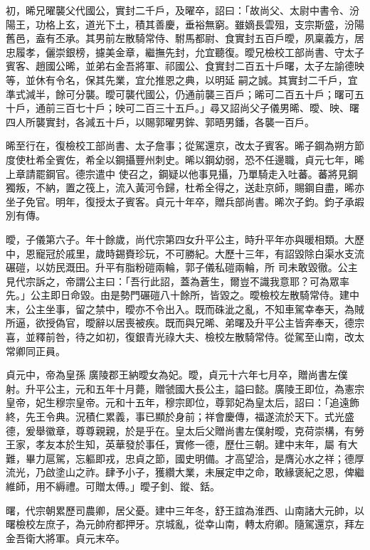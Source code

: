 \begin{pinyinscope}
 初，晞兄曜襲父代國公，實封二千戶，及曜卒，詔曰：「故尚父、太尉中書令、汾陽王，功格上玄，道光下土，積其善慶，垂裕無窮。雖嫡長雲殂，支宗斯盛，汾陽舊邑，盍有丕承。其男前左散騎常侍、駙馬都尉、食實封五百戶曖，夙稟義方，居忠履孝，儷崇銀榜，攄美金章，繼撫先封，允宜聽復。曖兄檢校工部尚書、守太子賓客、趙國公晞，並弟右金吾將軍、祁國公、食實封二百五十戶曙，太子左諭德映等，並休有令名，保其先業，宜允推恩之典，以明延
 嗣之誠。其實封二千戶，宜準式減半，餘可分襲。曖可襲代國公，仍通前襲三百戶；晞可二百五十戶；曙可五十戶，通前三百七十戶；映可二百三十五戶。」尋又詔尚父子儀男晞、曖、映、曙四人所襲實封，各減五十戶，以賜郭曜男鉾、郭晤男鐇，各襲一百戶。



 晞至行在，復檢校工部尚書、太子詹事；從駕還京，改太子賓客。晞子鋼為朔方節度使杜希全賓佐，希全以鋼攝豐州刺史。晞以鋼幼弱，恐不任邊職，貞元七年，晞上章請罷鋼官。德宗遣中
 使召之，鋼疑以他事見攝，乃單騎走入吐蕃。蕃將見鋼獨叛，不納，置之筏上，流入黃河令歸，杜希全得之，送赴京師，賜鋼自盡，晞亦坐子免官。明年，復授太子賓客。貞元十年卒，贈兵部尚書。晞次子鈞。鈞子承嘏別有傳。



 曖，子儀第六子。年十餘歲，尚代宗第四女升平公主，時升平年亦與暖相類。大歷中，恩寵冠於戚里，歲時錫賚珍玩，不可勝紀。大歷十三年，有詔毀除白渠水支流碾磑，以妨民溉田。升平有脂粉磑兩輪，郭子儀私磑兩輪，所
 司未敢毀徹。公主見代宗訴之，帝謂公主曰：「吾行此詔，蓋為蒼生，爾豈不識我意耶？可為眾率先。」公主即日命毀。由是勢門碾磑八十餘所，皆毀之。曖檢校左散騎常侍。建中末，公主坐事，留之禁中，曖亦不令出入。既而硃泚之亂，不知車駕幸奉天，為賊所逼，欲授偽官，曖辭以居喪被疾。既而與兄晞、弟曙及升平公主皆奔奉天，德宗喜，並釋前咎，待之如初，復銀青光祿大夫、檢校左散騎常侍。從駕至山南，改太常卿同正員。



 貞元中，帝為皇孫
 廣陵郡王納曖女為妃。曖，貞元十六年七月卒，贈尚書左僕射。升平公主，元和五年十月薨，贈虢國大長公主，謚曰懿。廣陵王即位，為憲宗皇帝，妃生穆宗皇帝。元和十五年，穆宗即位，尊郭妃為皇太后，詔曰：「追遠飾終，先王令典。況積仁累義，事已顯於身前；祥會慶傳，福遂流於天下。式光盛德，爰舉徽章，尊尊親親，於是乎在。皇太后父贈尚書左僕射曖，克荷崇構，有勞王家，孝友本於生知，英華發於事任，實修一德，歷仕三朝。建中末年，屬
 有大難，畢力扈駕，忘軀即戎，忠貞之節，國史明備。才高望洽，是膺沁水之祥；德厚流光，乃啟塗山之祚。肆予小子，獲纘大業，未展定申之命，敢緣褒紀之恩，俾繼維師，用不縟禮。可贈太傅。」曖子釗、鏦、銛。



 曙，代宗朝累歷司農卿，居父憂。建中三年冬，舒王誼為淮西、山南諸大元帥，以曙檢校左庶子，為元帥府都押牙。京城亂，從幸山南，轉太府卿。隨駕還京，拜左金吾衛大將軍。貞元末卒。




\end{pinyinscope}
